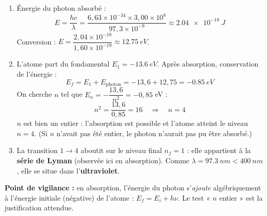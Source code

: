 \documentclass[11pt]{article}
\begin{document}
\begin{corrige}
\begin{enumerate}
\item Énergie du photon absorbé :
\[
E = \frac{hc}{\lambda} = \frac{6,63\times 10^{-34}\times 3,00\times 10^{8}}{97,3\times 10^{-9}} \approx \SI{2,04e-18}{J}
\]
Conversion : $E = \dfrac{2,04\times 10^{-18}}{1,60\times 10^{-19}} \approx \SI{12,75}{eV}$.
\item L'atome part du fondamental $E_1 = -\SI{13,6}{eV}$. Après absorption, conservation de l'énergie :
\[
E_f = E_1 + E_{\text{photon}} = -13,6 + 12,75 = \SI{-0,85}{eV}
\]
On cherche $n$ tel que $E_n = -\dfrac{13,6}{n^2} = -0,85$ eV :
\[
n^2 = \frac{13,6}{0,85} = 16 \quad \Rightarrow \quad n = 4
\]
$n$ est bien un entier : l'absorption est possible et l'atome atteint le niveau \textbf{$n = 4$}. (Si $n$ n'avait pas été entier, le photon n'aurait pas pu être absorbé.)
\item La transition $1 \to 4$ aboutit sur le niveau final $n_f = 1$ : elle appartient à la \textbf{série de Lyman} (observée ici en absorption). Comme $\lambda = \SI{97,3}{nm} < \SI{400}{nm}$, elle se situe dans l'\textbf{ultraviolet}.
\end{enumerate}
\textbf{Point de vigilance :} en absorption, l'énergie du photon s'\emph{ajoute} algébriquement à l'énergie initiale (négative) de l'atome : $E_f = E_i + h\nu$. Le test « $n$ entier » est la justification attendue.
\end{corrige}
\end{document}
